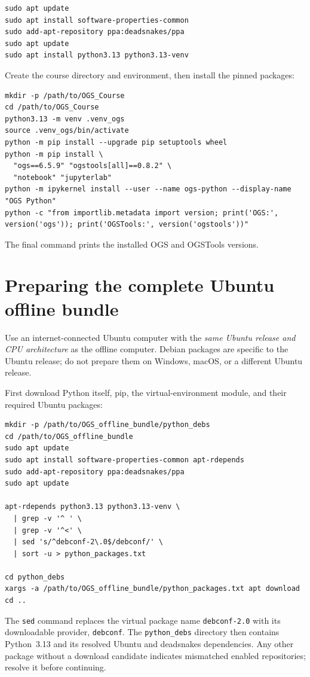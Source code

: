 \documentclass[11pt,a4paper]{tubaf-report}
\begin{document}
\begin{lstlisting}[style=terminal]
sudo apt update
sudo apt install software-properties-common
sudo add-apt-repository ppa:deadsnakes/ppa
sudo apt update
sudo apt install python3.13 python3.13-venv
\end{lstlisting}

Create the course directory and environment, then install the pinned packages:

\begin{lstlisting}[style=terminal]
mkdir -p /path/to/OGS_Course
cd /path/to/OGS_Course
python3.13 -m venv .venv_ogs
source .venv_ogs/bin/activate
python -m pip install --upgrade pip setuptools wheel
python -m pip install \
  "ogs==6.5.9" "ogstools[all]==0.8.2" \
  "notebook" "jupyterlab"
python -m ipykernel install --user --name ogs-python --display-name "OGS Python"
python -c "from importlib.metadata import version; print('OGS:', version('ogs')); print('OGSTools:', version('ogstools'))"
\end{lstlisting}

The final command prints the installed OGS and OGSTools versions.

\section{Preparing the complete Ubuntu offline bundle}

Use an internet-connected Ubuntu computer with the \emph{same Ubuntu release
and CPU architecture} as the offline computer. Debian packages are specific to
the Ubuntu release; do not prepare them on Windows, macOS, or a different Ubuntu
release.

First download Python itself, pip, the virtual-environment module, and their
required Ubuntu packages:

\begin{lstlisting}[style=terminal]
mkdir -p /path/to/OGS_offline_bundle/python_debs
cd /path/to/OGS_offline_bundle
sudo apt update
sudo apt install software-properties-common apt-rdepends
sudo add-apt-repository ppa:deadsnakes/ppa
sudo apt update

apt-rdepends python3.13 python3.13-venv \
  | grep -v '^ ' \
  | grep -v '^<' \
  | sed 's/^debconf-2\.0$/debconf/' \
  | sort -u > python_packages.txt

cd python_debs
xargs -a /path/to/OGS_offline_bundle/python_packages.txt apt download
cd ..
\end{lstlisting}

The \texttt{sed} command replaces the virtual package name
\texttt{debconf-2.0} with its downloadable provider, \texttt{debconf}. The
\texttt{python\_debs} directory then contains Python~3.13 and its resolved
Ubuntu and deadsnakes dependencies. Any other package without a download
candidate indicates mismatched enabled repositories; resolve it before continuing.
\end{document}

